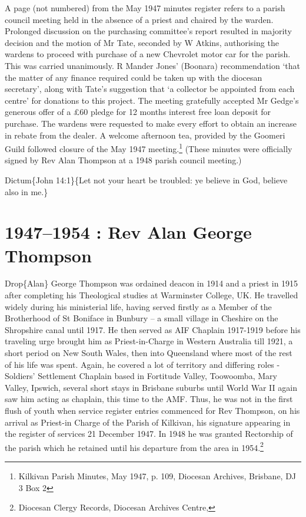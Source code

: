 A page (not numbered) from the May 1947 minutes register refers to a parish council meeting held in the absence of a priest and chaired by the warden. Prolonged discussion on the purchasing committee's report resulted in majority decision and the motion of Mr Tate, seconded by W Atkins, authorising the wardens to proceed with purchase of a new Chevrolet motor car for the parish. This was carried unanimously. R Mander Jones' (Boonara) recommendation `that the matter of any finance required could be taken up with the diocesan secretary', along with Tate's suggestion that `a collector be appointed from each centre' for donations to this project. The meeting gratefully accepted Mr Gedge's generous offer of a £60 pledge for 12 months interest free loan deposit for purchase. The wardens were requested to make every effort to obtain an increase in rebate from the dealer. A welcome afternoon tea, provided by the Goomeri Guild followed closure of the May 1947 meeting.\footnote{Kilkivan Parish Minutes, May 1947, p. 109, Diocesan Archives, Brisbane, DJ 3 Box 2} (These minutes were officially signed by Rev Alan Thompson at a 1948 parish council meeting.)

Dictum\{John 14:1\}\{Let not your heart be troubled: ye believe in God, believe also in me.\}

\hypertarget{rev-alan-george-thompson}{%
\chapter{1947--1954 : Rev Alan George Thompson}\label{rev-alan-george-thompson}}

Drop\{Alan\} George Thompson was ordained deacon in 1914 and a priest in 1915 after completing his Theological studies at Warminster College, UK. He travelled widely during his ministerial life, having served firstly as a Member of the Brotherhood of St Boniface in Bunbury -- a small village in Cheshire on the Shropshire canal until 1917. He then served as AIF Chaplain 1917-1919 before his traveling urge brought him as Priest-in-Charge in Western Australia till 1921, a short period on New South Wales, then into Queensland where most of the rest of his life was spent. Again, he covered a lot of territory and differing roles - Soldiers' Settlement Chaplain based in Fortitude Valley, Toowoomba, Mary Valley, Ipswich, several short stays in Brisbane suburbs until World War II again saw him acting as chaplain, this time to the AMF. Thus, he was not in the first flush of youth when service register entries commenced for Rev Thompson, on his arrival as Priest-in Charge of the Parish of Kilkivan, his signature appearing in the register of services 21 December 1947. In 1948 he was granted Rectorship of the parish which he retained until his departure from the area in 1954.\footnote{Diocesan Clergy Records, Diocesan Archives Centre,}

